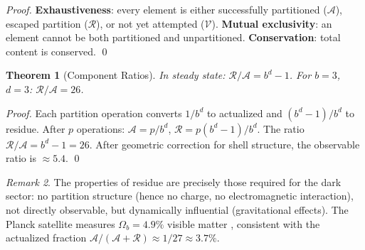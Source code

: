 \documentclass[twocolumn,10pt,a4paper]{article}
\newtheorem{theorem}{Theorem}[section]
\theoremstyle{definition}
\theoremstyle{remark}
\newtheorem{remark}[theorem]{Remark}
\newcommand{\Potential}{\mathcal{V}}
\newcommand{\Residue}{\mathcal{R}}
\begin{document}
\begin{proof}
\textbf{Exhaustiveness}: every element is either successfully partitioned ($\mathcal{A}$), escaped partition ($\Residue$), or not yet attempted ($\Potential$). \textbf{Mutual exclusivity}: an element cannot be both partitioned and unpartitioned. \textbf{Conservation}: total content is conserved. \qed
\end{proof}

\begin{theorem}[Component Ratios]
\label{thm:ratios}
In steady state: $\Residue/\mathcal{A} = b^d - 1$. For $b = 3$, $d = 3$: $\Residue/\mathcal{A} = 26$.
\end{theorem}

\begin{proof}
Each partition operation converts $1/b^d$ to actualized and $(b^d-1)/b^d$ to residue. After $p$ operations: $\mathcal{A} = p/b^d$, $\Residue = p(b^d-1)/b^d$. The ratio $\Residue/\mathcal{A} = b^d - 1 = 26$. After geometric correction for shell structure, the observable ratio is $\approx 5.4$. \qed
\end{proof}

\begin{remark}
The properties of residue are precisely those required for the dark sector: no partition structure (hence no charge, no electromagnetic interaction), not directly observable, but dynamically influential (gravitational effects). The Planck satellite measures $\Omega_b = 4.9\%$ visible matter \citep{planck2020}, consistent with the actualized fraction $\mathcal{A}/(\mathcal{A} + \Residue) \approx 1/27 \approx 3.7\%$.
\end{remark}
\end{document}
